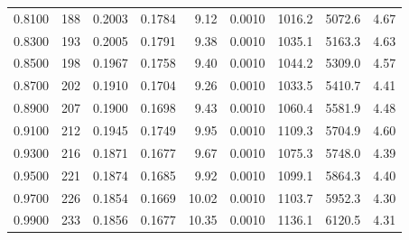 {\begin{longtable}{lrrrrrrrr}
  0.8100 & 188 & 0.2003 & 0.1784 & 9.12 & 0.0010 & 1016.2 & 5072.6 & 4.67 \\
  0.8300 & 193 & 0.2005 & 0.1791 & 9.38 & 0.0010 & 1035.1 & 5163.3 & 4.63 \\
  0.8500 & 198 & 0.1967 & 0.1758 & 9.40 & 0.0010 & 1044.2 & 5309.0 & 4.57 \\
  0.8700 & 202 & 0.1910 & 0.1704 & 9.26 & 0.0010 & 1033.5 & 5410.7 & 4.41 \\
  0.8900 & 207 & 0.1900 & 0.1698 & 9.43 & 0.0010 & 1060.4 & 5581.9 & 4.48 \\
  0.9100 & 212 & 0.1945 & 0.1749 & 9.95 & 0.0010 & 1109.3 & 5704.9 & 4.60 \\
  0.9300 & 216 & 0.1871 & 0.1677 & 9.67 & 0.0010 & 1075.3 & 5748.0 & 4.39 \\
  0.9500 & 221 & 0.1874 & 0.1685 & 9.92 & 0.0010 & 1099.1 & 5864.3 & 4.40 \\
  0.9700 & 226 & 0.1854 & 0.1669 & 10.02 & 0.0010 & 1103.7 & 5952.3 & 4.30 \\
  0.9900 & 233 & 0.1856 & 0.1677 & 10.35 & 0.0010 & 1136.1 & 6120.5 & 4.31 \\
\end{longtable}
}

